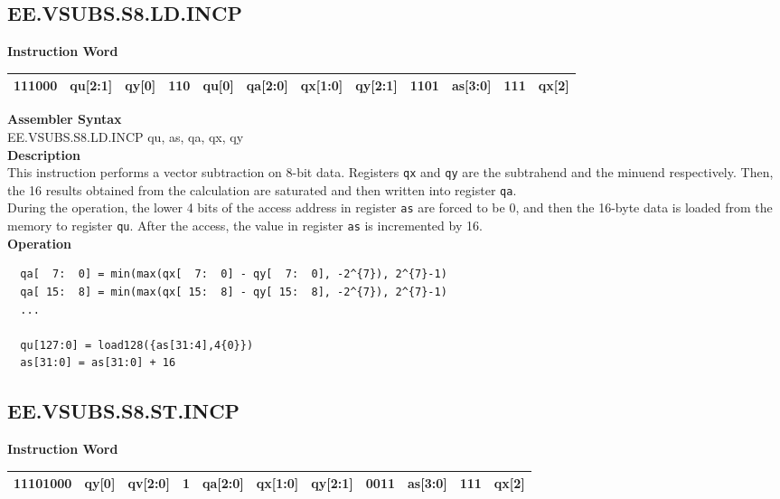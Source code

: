 \clearpage
\subsection{EE.VSUBS.S8.LD.INCP}\label{instruction:EEVSUBSS8LDINCP}
\setlength\tabcolsep{6pt}
\textbf{Instruction Word} \\
\begin{tabular}{|c|c|c|c|c|c|c|c|c|c|c|c|}
	\hline
	111000 & qu[2:1] & qy[0] & 110 & qu[0] & qa[2:0] & qx[1:0] & qy[2:1] & 1101 & as[3:0] & 111 & qx[2] \\
	\hline
\end{tabular}

\textbf{Assembler Syntax} \\
EE.VSUBS.S8.LD.INCP qu, as, qa, qx, qy \\
\textbf{Description} \\
This instruction performs a vector subtraction on 8-bit data. Registers \lstinline{qx} and \lstinline{qy} are the subtrahend and the minuend respectively. Then, the 16 results obtained from the calculation are saturated and then written into register \lstinline{qa}. \\ During the operation, the lower 4 bits of the access address in register \lstinline{as} are forced to be 0, and then the 16-byte data is loaded from the memory to register \lstinline{qu}. After the access, the value in register \lstinline{as} is incremented by 16.\\
\textbf{Operation}
\begin{lstlisting}
  qa[  7:  0] = min(max(qx[  7:  0] - qy[  7:  0], -2^{7}), 2^{7}-1)
  qa[ 15:  8] = min(max(qx[ 15:  8] - qy[ 15:  8], -2^{7}), 2^{7}-1)
  ...

  qu[127:0] = load128({as[31:4],4{0}})
  as[31:0] = as[31:0] + 16
\end{lstlisting}

\clearpage
\subsection{EE.VSUBS.S8.ST.INCP}\label{instruction:EEVSUBSS8STINCP}
\setlength\tabcolsep{6pt}
\textbf{Instruction Word} \\
\begin{tabular}{|c|c|c|c|c|c|c|c|c|c|c|}
	\hline
	11101000 & qy[0] & qv[2:0] & 1 & qa[2:0] & qx[1:0] & qy[2:1] & 0011 & as[3:0] & 111 & qx[2] \\
	\hline
\end{tabular}

